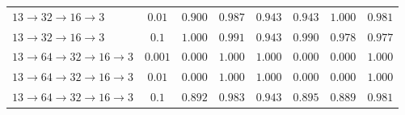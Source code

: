 {\begin{tabular}{@{}p{}c*{6}{c}@{}}
\(13 \rightarrow 32 \rightarrow 16 \rightarrow 3\) & \(0.01\) & \(0.900\) & \(0.987\) & \(0.943\) & \(0.943\) & \(1.000\) & \(0.981\) \\
\(13 \rightarrow 32 \rightarrow 16 \rightarrow 3\) & \(0.1\) & \(1.000\) & \(0.991\) & \(0.943\) & \(0.990\) & \(0.978\) & \(0.977\) \\
\(13 \rightarrow 64 \rightarrow 32 \rightarrow 16 \rightarrow 3\) & \(0.001\) & \(0.000\) & \(1.000\) & \(1.000\) & \(0.000\) & \(0.000\) & \(1.000\) \\
\(13 \rightarrow 64 \rightarrow 32 \rightarrow 16 \rightarrow 3\) & \(0.01\) & \(0.000\) & \(1.000\) & \(1.000\) & \(0.000\) & \(0.000\) & \(1.000\) \\
\(13 \rightarrow 64 \rightarrow 32 \rightarrow 16 \rightarrow 3\) & \(0.1\) & \(0.892\) & \(0.983\) & \(0.943\) & \(0.895\) & \(0.889\) & \(0.981\) \\
\bottomrule
\end{tabular}
}
